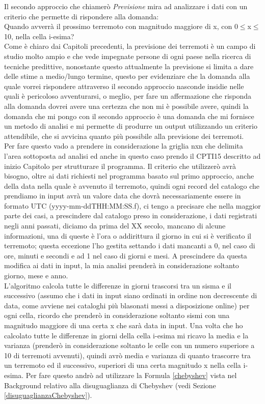 Il secondo approccio che chiamer\`o \textit{Previsione} mira ad analizzare i dati con un criterio che permette di rispondere alla domanda:\\
Quando avverr\`a il prossimo terremoto con magnitudo maggiore di x, con 0$\le$x$\le$10, nella cella i-esima?\\
Come \`e chiaro dai Capitoli precedenti, la previsione dei terremoti \`e un campo di studio molto ampio e che vede impegnate persone di ogni paese nella ricerca di tecniche predittive, nonostante questo attualmente la previsione si limita a dare delle stime a medio/lungo termine, questo per evidenziare che la domanda alla quale vorrei rispondere attraverso il secondo approccio nasconde insidie nelle quali \`e pericoloso avventurarsi, o meglio, per fare un affermazione che risponda alla domanda dovrei avere una certezza che non mi \`e possibile avere, quindi la domanda che mi pongo con il secondo approccio \`e una domanda che mi fornisce un metodo di analisi e mi permette di produrre un output utilizzando un criterio attendibile, che si avvicina quanto pi\`u possibile alla previsione dei terremoti.\\
Per fare questo vado a prendere in considerazione la griglia nxn che delimita l'area sottoposta ad analisi ed anche in questo caso prendo il CPTI15 descritto ad inizio Capitolo per strutturare il programma. Il criterio che utilizzer\`o avr\`a bisogno, oltre ai dati richiesti nel programma basato sul primo approccio, anche della data nella quale \`e avvenuto il terremoto, quindi ogni record del catalogo che prendiamo in input avr\`a un valore data che dovr\`a necessariamente essere in formato UTC (yyyy-mm-ddTHH:MM:SS.f), ci tengo a precisare che nella maggior parte dei casi, a prescindere dal catalogo preso in considerazione, i dati registrati negli anni passati, diciamo da prima del XX secolo, mancano di alcune informazioni, una di queste \`e l'ora o addirittura il giorno in cui si \`e verificato il terremoto; questa eccezione l'ho gestita settando i dati mancanti a 0, nel caso di ore, minuti e secondi e ad 1 nel caso di giorni e mesi. A prescindere da questa modifica ai dati in input, la mia analisi prender\`a in considerazione soltanto giorno, mese e anno.\\
L'algoritmo calcola tutte le differenze in giorni trascorsi tra un sisma e il successivo (assumo che i dati in input siano ordinati in ordine non decrescente di data, come avviene nei cataloghi pi\`u blasonati messi a disposizione online) per ogni cella, ricordo che prender\`o in considerazione soltanto sismi con una magnitudo maggiore di una certa x che sar\`a data in input. Una volta che ho calcolato tutte le differenze in giorni della cella i-esima mi ricavo la media e la varianza (prender\`o in considerazione soltanto le celle con un numero superiore a 10 di terremoti avvenuti), quindi avr\`o media e varianza di quanto trascorre tra un terremoto ed il successivo, superiori di una certa magnitudo x nella cella i-esima. Per fare questo andr\`o ad utilizzare la Formula \ref{chebyshev} vista nel Background relativo alla disuguaglianza di Chebyshev (vedi Sezione \ref{disuguaglianzaChebyshev}).
